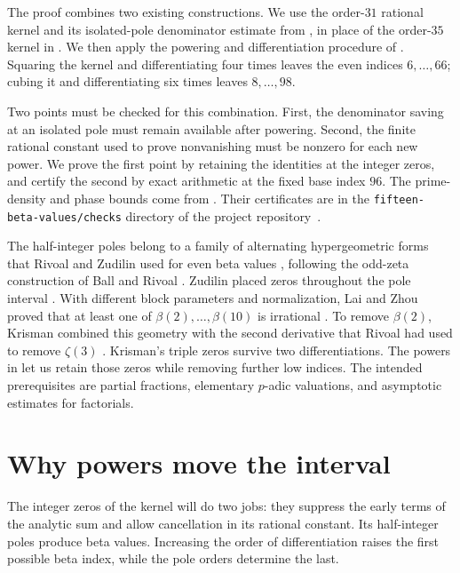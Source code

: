 \documentclass[11pt]{article}
\theoremstyle{remark}
\numberwithin{equation}{section}
\begin{document}
The proof combines two existing constructions. We use the
order-$31$ rational kernel and its isolated-pole denominator estimate
from \cite[Sections~2--4 and Appendix~A]{fifteen}, in place of the
order-$35$ kernel in \cite{powered}. We then apply the powering and
differentiation procedure of \cite[Sections~2--4]{powered}.
Squaring the kernel and differentiating four times leaves the even
indices $6,\ldots,66$; cubing it and differentiating six times leaves
$8,\ldots,98$.

Two points must be checked for this combination. First, the
denominator saving at an isolated pole must remain available after
powering. Second, the finite rational constant used to prove
nonvanishing must be nonzero for each new power. We prove the first
point by retaining the identities at the integer zeros, and certify
the second by exact arithmetic at the fixed base index $96$.
The prime-density and phase bounds come from \cite{fifteen}. Their certificates
are in the \texttt{fifteen-beta-values/checks} directory of the project
repository~\cite{beta4repo}.

The half-integer poles belong to a family of alternating hypergeometric
forms that Rivoal and Zudilin used for even beta values
\cite[Lemma~2]{rzbeta}, following the odd-zeta construction of
Ball and Rivoal \cite{ballrivoal}. Zudilin placed zeros throughout the
pole interval \cite[proof of Lemma~1 and Section~3]{zudbeta}.
With different block parameters and normalization, Lai and Zhou proved
that at least one of $\beta(2),\ldots,\beta(10)$ is irrational
\cite[Theorem~6.1]{laizhou}.
To remove $\beta(2)$, Krisman \cite[Sections~1.2 and~4]{krisman}
combined this geometry with the second derivative that Rivoal had used
to remove $\zeta(3)$ \cite[Section~2, Lemma~1]{rivoal}. Krisman's
triple zeros survive two differentiations. The powers in \cite{powered}
let us retain those zeros while removing further low indices.
The intended prerequisites are partial fractions, elementary
$p$-adic valuations, and asymptotic estimates for factorials.

\section{Why powers move the interval}\label{sec:forms}

The integer zeros of the kernel will do two jobs: they suppress the
early terms of the analytic sum and allow cancellation in its rational
constant. Its half-integer poles produce beta values. Increasing the
order of differentiation raises the first possible beta index, while
the pole orders determine the last.
\end{document}
